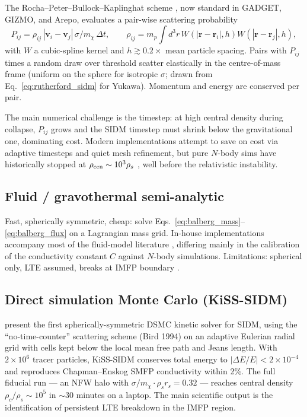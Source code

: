 \documentclass[12pt]{article}
\newcommand{\smx}{\sigma/m_\chi}
\begin{document}
The Rocha--Peter--Bullock--Kaplinghat scheme \citep{Rocha2013}, now
standard in GADGET, GIZMO, and Arepo, evaluates a pair-wise scattering
probability
%
\begin{equation}
  P_{ij} = \rho_{ij}\,|\mathbf{v}_i - \mathbf{v}_j|\,\smx\,\Delta t,
  \qquad
  \rho_{ij}
    = m_p\!\int d^3r\,W(|\mathbf{r}-\mathbf{r}_i|,h)
                    W(|\mathbf{r}-\mathbf{r}_j|,h),
  \label{eq:Pij}
\end{equation}
%
with $W$ a cubic-spline kernel and $h\gtrsim 0.2\times$ mean particle
spacing.  Pairs with $P_{ij}$ times a random draw over threshold scatter
elastically in the centre-of-mass frame (uniform on the sphere for
isotropic $\sigma$; drawn from
Eq.~\eqref{eq:rutherford_sidm} for Yukawa).  Momentum and energy are
conserved per pair.

The main numerical challenge is the timestep: at high central density
during collapse, $P_{ij}$ grows and the SIDM timestep must shrink
below the gravitational one, dominating cost.  Modern implementations
attempt to save on cost via adaptive timesteps and quiet mesh
refinement, but pure $N$-body sims have historically stopped at
$\rho_{\rm cen}\sim 10^3\rho_s$ \citep{Palubski2025}, well before the
relativistic instability.

\subsection{Fluid / gravothermal semi-analytic}

Fast, spherically symmetric, cheap: solve
Eqs.~\eqref{eq:balberg_mass}--\eqref{eq:balberg_flux} on a Lagrangian
mass grid.  In-house implementations accompany most of the
fluid-model literature
\citep{Balberg2002,Pollack2015,Correa2021,Meshveliani2023},
differing mainly in the calibration of the conductivity constant
$C$ against $N$-body simulations.  Limitations:
spherical only, LTE assumed, breaks at IMFP boundary
\citep{Gurian2025Core}.

\subsection{Direct simulation Monte Carlo (KiSS-SIDM)}

\citet{Gurian2025Core} present the first spherically-symmetric DSMC
kinetic solver for SIDM, using the ``no-time-counter'' scattering
scheme (Bird 1994) on an adaptive Eulerian radial grid with cells kept
below the local mean free path and Jeans length.  With $2\times 10^6$
tracer particles, KiSS-SIDM conserves total energy to
$|\Delta E/E| < 2\times 10^{-4}$ and reproduces Chapman--Enskog SMFP
conductivity within 2\%.  The full fiducial run --- an NFW halo with
$\smx\!\cdot\!\rho_s r_s = 0.32$ --- reaches central density
$\rho_c/\rho_s \sim 10^5$ in $\sim 30$ minutes on a laptop.  The main
scientific output is the identification of persistent LTE breakdown
in the IMFP region.
\end{document}
